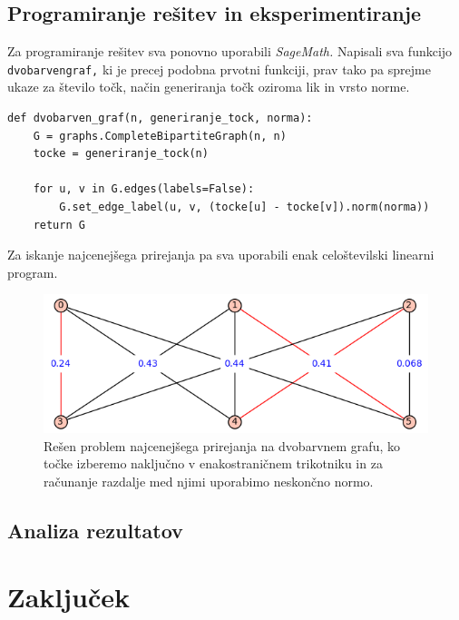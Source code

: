 \documentclass[a4paper, 11pt]{article}
\begin{document}
\subsection{Programiranje rešitev in eksperimentiranje}
Za programiranje rešitev sva ponovno uporabili \emph{SageMath.} Napisali sva funkcijo \texttt{dvobarven\underline{\space}graf,} ki je precej podobna prvotni funkciji,
prav tako pa sprejme ukaze za število točk, način generiranja točk oziroma lik in vrsto norme.

\begin{verbatim}
def dvobarven_graf(n, generiranje_tock, norma):
    G = graphs.CompleteBipartiteGraph(n, n)
    tocke = generiranje_tock(n)

    for u, v in G.edges(labels=False):
        G.set_edge_label(u, v, (tocke[u] - tocke[v]).norm(norma))
    return G
\end{verbatim}

Za iskanje najcenejšega prirejanja pa sva uporabili enak celoštevilski linearni program.

\begin{figure}[h!]
    \includegraphics[scale=0.7]{dvobarvenclp}
    \centering
    \caption{Rešen problem najcenejšega prirejanja na dvobarvnem grafu, ko točke izberemo naključno v enakostraničnem trikotniku in za računanje razdalje med njimi uporabimo neskončno normo.}
    \label{fig:dvobarvenclp}
\end{figure}

\subsection{Analiza rezultatov}


\section{Zaključek}

\end{document}
